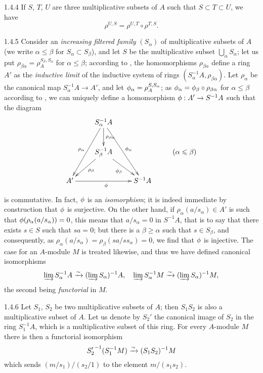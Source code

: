 \begin{env}{1.4.4}
\label{env-0.1.4.4}
If $S$, $T$, $U$ are three multiplicative subsets of $A$ such that $S\subset T\subset U$, we
have
\[
  \rho^{U,S}=\rho^{U,T}\circ\rho^{T,S}.
\]
\end{env}

\begin{env}{1.4.5}
\label{env-0.1.4.5}
Consider an \emph{increasing filtered family} $(S_\alpha)$ of multiplicative subsets of $A$
(we write $\alpha\leqslant\beta$ for $S_\alpha\subset S_\beta$), and let $S$ be the
multiplicative subset $\bigcup_\alpha S_\alpha$; let us put
$\rho_{\beta\alpha}=\rho_A^{S_\beta,S_\alpha}$ for $\alpha\leq\beta$; according to
, the homomorphisms $\rho_{\beta\alpha}$ define a ring $A'$ as the
\emph{inductive limit} of the inductive system of rings
$(S_\alpha^{-1}A,\rho_{\beta\alpha})$. Let $\rho_\alpha$ be the canonical map
$S_\alpha^{-1}A\to A'$, and let $\phi_\alpha=\rho_A^{S,S_\alpha}$; as
$\phi_\alpha=\phi_\beta\circ\rho_{\beta\alpha}$ for $\alpha\leqslant\beta$ according to
, we can uniquely define a homomorphism $\phi:A'\to S^{-1}A$ such that the
diagram
\[
  \xymatrix{
    & S_\alpha^{-1}A\ar[ddl]_{\rho_\alpha}
                    \ar[d]^{\rho_{\beta\alpha}}
                    \ar[rdd]^{\vphi_\alpha}\\
    & S_\beta^{-1}A\ar[ld]^{\rho_\beta}
                   \ar[rd]_{\vphi_\beta}
    & & (\alpha\leqslant\beta)\\
    A'\ar[rr]_\vphi
    & & S^{-1}A
  }
\]
is commutative. In fact, $\phi$ is an \emph{isomorphism}; it is indeed immediate by
construction that $\phi$ is surjective. On the other hand, if
$\rho_\alpha(a/s_\alpha)\in A'$ is such that ${\phi(\rho_\alpha(a/s_\alpha))=0}$, this means
that $a/s_\alpha=0$ in $S^{-1}A$, that is to say that there exists $s\in S$ such that
$sa=0$; but there is a $\beta\geqslant\alpha$ such that $s\in S_\beta$, and consequently, as
$\rho_\alpha(a/s_\alpha)=\rho_\beta(sa/ss_\alpha)=0$, we find that $\phi$ is injective.
The case for an $A$-module $M$ is treated likewise, and thus we have defined canonical
isomorphisms
\[
  \varinjlim S_\alpha^{-1}A\xrightarrow{\sim}(\varinjlim S_\alpha)^{-1}A,\quad
  \varinjlim S_\alpha^{-1}M\xrightarrow{\sim}(\varinjlim S_\alpha)^{-1}M,
\]
the second being \emph{functorial} in $M$.
\end{env}

\begin{env}{1.4.6}
\label{env-0.1.4.6}
Let $S_1$, $S_2$ be two multiplicative subsets of $A$; then $S_1 S_2$ is also a
multiplicative subset of $A$. Let us denote by $S_2'$ the canonical image of $S_2$ in the
ring $S_1^{-1}A$, which is a multiplicative subset of this ring. For every $A$-module $M$
there is then a functorial isomorphism
\[
  {S_2'}^{-1}(S_1^{-1}M)\xrightarrow{\sim}(S_1 S_2)^{-1}M
\]
which sends $(m/s_1)/(s_2/1)$ to the element $m/(s_1 s_2)$.
\end{env}

